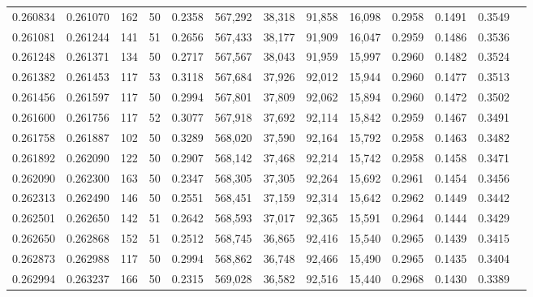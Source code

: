 \begin{tabular}{rrrrrrrrrrrrr}
0.260834 & 0.261070 &   162 &  50 &                                     0.2358 & 567,292 &  38,318 &  91,858 &  16,098 & 0.2958 & 0.1491 & 0.3549 \\
0.261081 & 0.261244 &   141 &  51 &                                     0.2656 & 567,433 &  38,177 &  91,909 &  16,047 & 0.2959 & 0.1486 & 0.3536 \\
0.261248 & 0.261371 &   134 &  50 &                                     0.2717 & 567,567 &  38,043 &  91,959 &  15,997 & 0.2960 & 0.1482 & 0.3524 \\
0.261382 & 0.261453 &   117 &  53 &                                     0.3118 & 567,684 &  37,926 &  92,012 &  15,944 & 0.2960 & 0.1477 & 0.3513 \\
0.261456 & 0.261597 &   117 &  50 &                                     0.2994 & 567,801 &  37,809 &  92,062 &  15,894 & 0.2960 & 0.1472 & 0.3502 \\
0.261600 & 0.261756 &   117 &  52 &                                     0.3077 & 567,918 &  37,692 &  92,114 &  15,842 & 0.2959 & 0.1467 & 0.3491 \\
0.261758 & 0.261887 &   102 &  50 &                                     0.3289 & 568,020 &  37,590 &  92,164 &  15,792 & 0.2958 & 0.1463 & 0.3482 \\
0.261892 & 0.262090 &   122 &  50 &                                     0.2907 & 568,142 &  37,468 &  92,214 &  15,742 & 0.2958 & 0.1458 & 0.3471 \\
0.262090 & 0.262300 &   163 &  50 &                                     0.2347 & 568,305 &  37,305 &  92,264 &  15,692 & 0.2961 & 0.1454 & 0.3456 \\
0.262313 & 0.262490 &   146 &  50 &                                     0.2551 & 568,451 &  37,159 &  92,314 &  15,642 & 0.2962 & 0.1449 & 0.3442 \\
0.262501 & 0.262650 &   142 &  51 &                                     0.2642 & 568,593 &  37,017 &  92,365 &  15,591 & 0.2964 & 0.1444 & 0.3429 \\
0.262650 & 0.262868 &   152 &  51 &                                     0.2512 & 568,745 &  36,865 &  92,416 &  15,540 & 0.2965 & 0.1439 & 0.3415 \\
0.262873 & 0.262988 &   117 &  50 &                                     0.2994 & 568,862 &  36,748 &  92,466 &  15,490 & 0.2965 & 0.1435 & 0.3404 \\
0.262994 & 0.263237 &   166 &  50 &                                     0.2315 & 569,028 &  36,582 &  92,516 &  15,440 & 0.2968 & 0.1430 & 0.3389 \\

\end{tabular}

